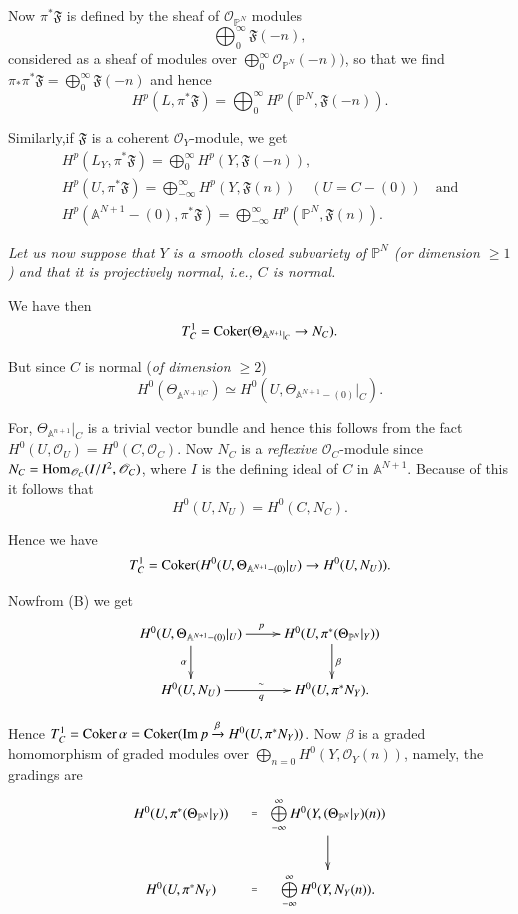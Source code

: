 {Now $\pi^{\ast}\mathfrak{F}$ is defined by the sheaf of
$\mathscr{O}_{\mathbb{P}^{N}}$ modules
$$
\bigoplus^{\infty}_{0}\mathfrak{F}(-n),
$$
considered as a sheaf of modules over
$\bigoplus\limits^{\infty}_{0}\mathscr{O}_{\mathbb{P}^{N}}(-n))$, so
that we find
$\pi_{\ast}\pi^{\ast}\mathfrak{F}=\bigoplus\limits^{\infty}_{0}\mathfrak{F}(-n)$
and hence
$$
H^{p}(L,\pi^{\ast}\mathfrak{F})=\bigoplus^{\infty}_{0}H^{p}(\mathbb{P}^{N},\mathfrak{F}(-n)).
$$


Similarly,\pageoriginale if $\mathfrak{F}$ is a coherent
$\mathscr{O}_{Y}$-module, we get
\begin{gather*}
H^{p}(L_{Y},\pi^{\ast}\mathfrak{F})=\bigoplus^{\infty}_{0}H^{p}(Y,\mathfrak{F}(-n)),\\[5pt] 
H^{p}(U,\pi^{\ast}\mathfrak{F})=\bigoplus^{\infty}_{-\infty}H^{p}(Y,\mathfrak{F}(n))\quad
(U=C-(0))\quad\text{and}\\[5pt]
H^{p}(\mathbb{A}^{N+1}-(0),\pi^{\ast}\mathfrak{F})=\bigoplus^{\infty}_{-\infty}H^{p}(\mathbb{P}^{N},\mathfrak{F}(n)). 
\end{gather*}

{\em Let us now suppose that $Y$ is a smooth closed subvariety of
  $\mathbb{P}^{N}$ (or dimension $\geq 1$) and that it is projectively
  normal, i.e., $C$ is normal.}

We have then
$$
T^{1}_{C}=\operatorname{Coker} (\Theta_{\mathbb{A}^{N+1}|_{C}}\to N_{C}).
$$

But since $C$ is normal ({\em of dimension $\geq 2$})
$$
H^{0}(\Theta_{\mathbb{A}^{N+1|C}})\simeq 
H^{0}(U,\Theta_{\mathbb{A}^{N+1}-(0)}|_{C}). 
$$

For, $\Theta_{\mathbb{A}^{n+1}}|_{C}$ is a trivial vector bundle and
hence this follows from the fact
$H^{0}(U,\mathscr{O}_{U})=H^{0}(C,\mathscr{O}_{C})$. Now $N_{C}$ is a
{\em reflexive} $\mathscr{O}_{C}$-module since
$N_{C}=\operatorname{Hom}_{\mathscr{O}_{C}}(I/I^{2},\mathscr{O}_{C})$, where $I$ is
the defining ideal of $C$ in $\mathbb{A}^{N+1}$. Because of this it
follows that
$$
H^{0}(U,N_{U})=H^{0}(C,N_{C}).
$$

Hence we have
$$
T^{1}_{C}=\operatorname{Coker} (H^{0}(U,\Theta_{\mathbb{A}^{N+1}-(0)}|_{U})\to
H^{0}(U,N_{U})). 
$$

Now\pageoriginale from (B) we get
\[
\xymatrix{
H^{0}(U,\Theta_{\mathbb{A}^{N+1}-(0)}|_{U})\ar[r]^{p}\ar[d]_{\alpha} &
H^{0}(U,\pi^{\ast}(\Theta_{\mathbb{P}^{N}}|_{Y}))\ar[d]^{\beta}\\
H^{0}(U,N_{U})\ar[r]^{\sim}_{q} & H^{0}(U,\pi^{\ast}N_{Y}).
}
\]

Hence $T^{1}_{C}=\operatorname{Coker} \alpha=\operatorname{Coker} (\operatorname{Im}
p\xrightarrow{\beta}H^{0}(U,\pi^{\ast}N_{Y}))$. Now $\beta$ is a
graded homomorphism of graded modules over
$\bigoplus\limits_{n=0}H^{0}(Y,\mathscr{O}_{Y}(n))$, namely, the
gradings are
\[
\xymatrix{
H^{0}(U,\pi^{\ast}(\Theta_{\mathbb{P}^{N}}|_{Y}))\ar@{}[r]|{=} &
\bigoplus\limits^{\infty}_{-\infty}H^{0}(Y,(\Theta_{\mathbb{P}^{N}}|_{Y})(n))\ar[d]\\
H^{0}(U,\pi^{\ast}N_{Y})\ar@{}[r]|{=} &
\bigoplus\limits^{\infty}_{-\infty}H^{0}(Y,N_{Y}(n)). 
}
\]

}
